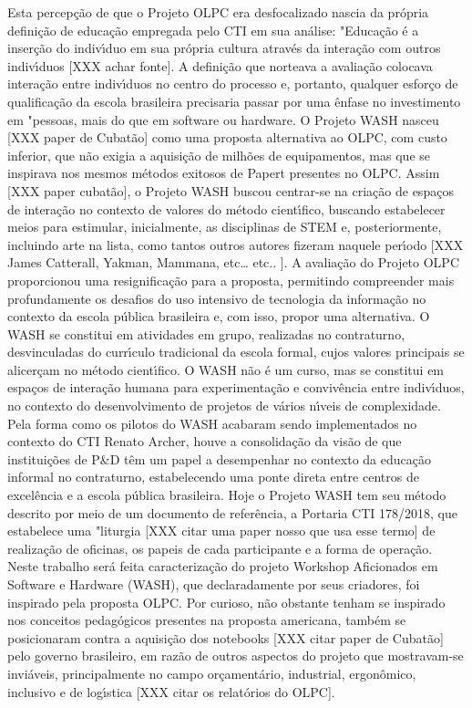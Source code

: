 \documentclass[
12pt,		%
openright,	%
twoside,  %
a4paper,			%
chapter=TITLE,		%
english,			%
french,				%
spanish,			%
brazil				%
]{USPSC-classe/USPSC}
\begin{document}
Esta percep\c{c}\~ao de que o Projeto OLPC era desfocalizado nascia da pr\'opria defini\c{c}\~ao de educa\c{c}\~ao empregada pelo CTI em sua an\'alise: "Educa\c{c}\~ao \'e a inser\c{c}\~ao do indiv\'{\i}duo em sua pr\'opria cultura atrav\'es da intera\c{c}\~ao com outros indiv\'{\i}duos [XXX achar fonte].
A defini\c{c}\~ao que norteava a avalia\c{c}\~ao colocava intera\c{c}\~ao entre indiv\'{\i}duos no centro do processo e, portanto, qualquer esfor\c{c}o de qualifica\c{c}\~ao da escola brasileira precisaria passar por uma \^enfase no investimento em "pessoas, mais do que em software ou hardware.
O Projeto WASH nasceu [XXX paper de Cubat\~ao] como uma proposta alternativa ao OLPC, com custo inferior, que n\~ao exigia a aquisi\c{c}\~ao de milh\~oes de equipamentos, mas que se inspirava nos mesmos m\'etodos exitosos de Papert presentes no OLPC.
Assim [XXX paper cubat\~ao], o Projeto WASH buscou centrar-se na cria\c{c}\~ao de espa\c{c}os de intera\c{c}\~ao no contexto de valores do m\'etodo cient\'{\i}fico, buscando estabelecer meios para estimular, inicialmente, as disciplinas de STEM e, posteriormente, incluindo arte na lista, como tantos outros autores fizeram naquele per\'{\i}odo [XXX James Catterall, Yakman, Mammana, etc… etc.. ].
A avalia\c{c}\~ao do Projeto OLPC proporcionou uma resignifica\c{c}\~ao para a proposta, permitindo compreender mais profundamente os desafios do uso intensivo de tecnologia da informa\c{c}\~ao no contexto da escola p\'ublica brasileira e, com isso, propor uma alternativa.
O WASH se constitui em atividades em grupo, realizadas no contraturno, desvinculadas do curr\'{\i}culo tradicional da escola formal, cujos valores principais se alicer\c{c}am no m\'etodo cient\'{\i}fico. O WASH n\~ao \'e um curso, mas se constitui em espa\c{c}os de intera\c{c}\~ao humana para experimenta\c{c}\~ao e conviv\^encia entre indiv\'{\i}duos, no contexto do desenvolvimento de projetos de v\'arios n\'{\i}veis de complexidade.
Pela forma como os pilotos do WASH acabaram sendo implementados no contexto do CTI Renato Archer, houve a consolida\c{c}\~ao da vis\~ao de que institui\c{c}\~oes de P\&D t\^em um papel a desempenhar no contexto da educa\c{c}\~ao informal no contraturno, estabelecendo uma ponte direta entre centros de excel\^encia e a escola p\'ublica brasileira.
Hoje o Projeto WASH tem seu m\'etodo descrito por meio de um documento de refer\^encia, a Portaria CTI 178/2018, que estabelece uma "liturgia [XXX citar uma paper nosso que usa esse termo] de realiza\c{c}\~ao de oficinas, os papeis de cada participante e a forma de opera\c{c}\~ao. 
Neste trabalho ser\'a feita caracteriza\c{c}\~ao do projeto Workshop Aficionados em Software e Hardware (WASH), que declaradamente por seus criadores, foi inspirado pela proposta OLPC. Por curioso, n\~ao obstante tenham se inspirado nos conceitos pedag\'ogicos presentes na proposta americana, tamb\'em se posicionaram contra a aquisi\c{c}\~ao dos notebooks [XXX citar paper de Cubat\~ao] pelo governo brasileiro, em raz\~ao de outros aspectos do projeto que mostravam-se invi\'aveis, principalmente no campo or\c{c}ament\'ario, industrial, ergon\^omico, inclusivo e de log\'{\i}stica [XXX citar os relat\'orios do OLPC].
\end{document}

